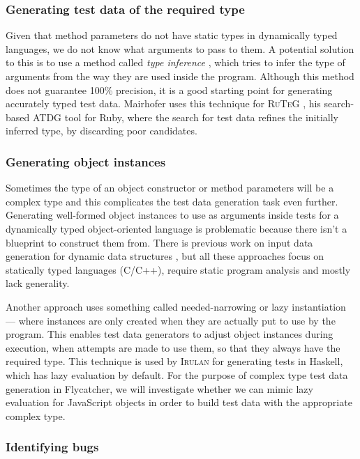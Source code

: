\documentclass[a4paper,11pt,titlepage]{report}
\begin{document}
\subsubsection{Generating test data of the required type}
Given that method parameters do not have static types in dynamically typed languages, we do not know what arguments to pass to them. A potential solution to this is to use a method called \emph{type inference} \cite{pluquet2009fast}, which tries to infer the type of arguments from the way they are used inside the program. Although this method does not guarantee 100\% precision, it is a good starting point for generating accurately typed test data. Mairhofer uses this technique for \textsc{\small RuTeG} \cite{mairhofer2008search}, his search-based ATDG tool for Ruby, where the search for test data refines the initially inferred type, by discarding poor candidates.

\subsubsection{Generating object instances}
Sometimes the type of an object constructor or method parameters will be a complex type and this complicates the test data generation task even further. Generating well-formed object instances to use as arguments inside tests for a dynamically typed object-oriented language is problematic because there isn't a blueprint to construct them from. There is previous work on input data generation for dynamic data structures \cite{korel1990automated, visvanathan2002generating, sai2005address, zhao2007automatic}, but all these approaches focus on statically typed languages (C/C++), require static program analysis and mostly lack generality.

Another approach uses something called needed-narrowing \cite{antoy1994needed} or lazy instantiation \cite{lindblad2007property} --- where instances are only created when they are actually put to use by the program. This enables test data generators to adjust object instances during execution, when attempts are made to use them, so that they always have the required type. This technique is used by \textsc{Irulan} \cite{allwood2011high} for generating tests in Haskell, which has lazy evaluation by default. For the purpose of complex type test data generation in \textsf{Flycatcher}, we will investigate whether we can mimic lazy evaluation for JavaScript objects in order to build test data with the appropriate complex type.

\subsubsection{Identifying bugs}
\end{document}
